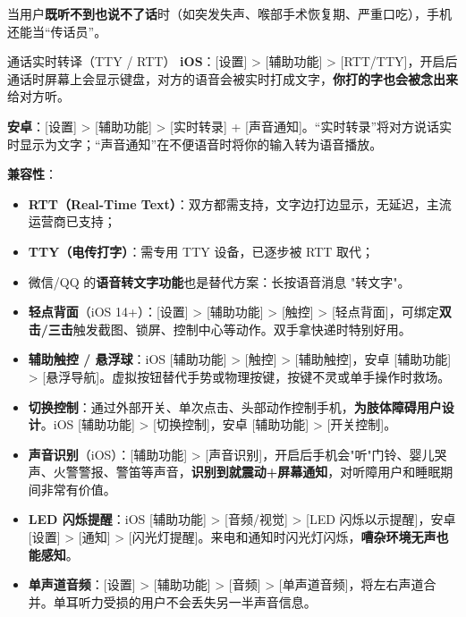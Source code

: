 
当用户\textbf{既听不到也说不了话}时（如突发失声、喉部手术恢复期、严重口吃），手机还能当“传话员”。

\begin{tcbinfo}{通话实时转译（TTY / RTT）}
\textbf{iOS}：[设置] > [辅助功能] > [RTT/TTY]，开启后通话时屏幕上会显示键盘，对方的语音会被实时打成文字，\textbf{你打的字也会被念出来}给对方听。

\textbf{安卓}：[设置] > [辅助功能] > [实时转录] + [声音通知]。“实时转录”将对方说话实时显示为文字；“声音通知”在不便语音时将你的输入转为语音播放。

\textbf{兼容性}：

\begin{itemize}
  \item \textbf{RTT（Real-Time Text）}：双方都需支持，文字边打边显示，无延迟，主流运营商已支持；
  \item \textbf{TTY（电传打字）}：需专用 TTY 设备，已逐步被 RTT 取代；
  \item 微信/QQ 的\textbf{语音转文字功能}也是替代方案：长按语音消息 "转文字"。
\end{itemize}

\end{tcbinfo}


\begin{itemize}
  \item \textbf{轻点背面}（iOS 14+）：[设置] > [辅助功能] > [触控] > [轻点背面]，可绑定\textbf{双击/三击}触发截图、锁屏、控制中心等动作。双手拿快递时特别好用。
  \item \textbf{辅助触控 / 悬浮球}：iOS [辅助功能] > [触控] > [辅助触控]，安卓 [辅助功能] > [悬浮导航]。虚拟按钮替代手势或物理按键，按键不灵或单手操作时救场。
  \item \textbf{切换控制}：通过外部开关、单次点击、头部动作控制手机，\textbf{为肢体障碍用户设计}。iOS [辅助功能] > [切换控制]，安卓 [辅助功能] > [开关控制]。
  \item \textbf{声音识别}（iOS）：[辅助功能] > [声音识别]，开启后手机会"听"门铃、婴儿哭声、火警警报、警笛等声音，\textbf{识别到就震动+屏幕通知}，对听障用户和睡眠期间非常有价值。
  \item \textbf{LED 闪烁提醒}：iOS [辅助功能] > [音频/视觉] > [LED 闪烁以示提醒]，安卓 [设置] > [通知] > [闪光灯提醒]。来电和通知时闪光灯闪烁，\textbf{嘈杂环境无声也能感知}。
  \item \textbf{单声道音频}：[设置] > [辅助功能] > [音频] > [单声道音频]，将左右声道合并。单耳听力受损的用户不会丢失另一半声音信息。
\end{itemize}

